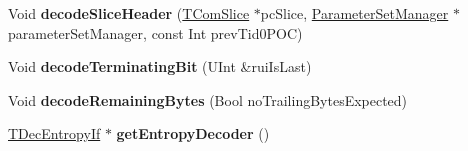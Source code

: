 \begin{DoxyCompactItemize}
Void {\bfseries decode\+Slice\+Header} (\hyperlink{class_t_com_slice}{T\+Com\+Slice} $\ast$pc\+Slice, \hyperlink{class_parameter_set_manager}{Parameter\+Set\+Manager} $\ast$parameter\+Set\+Manager, const Int prev\+Tid0\+P\+OC)
\item 
\mbox{\label{class_t_dec_entropy_a959108f6f4064fe849ae099e1c61909f}} 
Void {\bfseries decode\+Terminating\+Bit} (U\+Int \&rui\+Is\+Last)
\item 
\mbox{\label{class_t_dec_entropy_a9114e027a6ac765c8388c4f0ece4dda3}} 
Void {\bfseries decode\+Remaining\+Bytes} (Bool no\+Trailing\+Bytes\+Expected)
\item 
\mbox{\label{class_t_dec_entropy_a180cb438d3272f89456d74029ed9ea30}} 
\hyperlink{class_t_dec_entropy_if}{T\+Dec\+Entropy\+If} $\ast$ {\bfseries get\+Entropy\+Decoder} ()
\end{DoxyCompactItemize}
